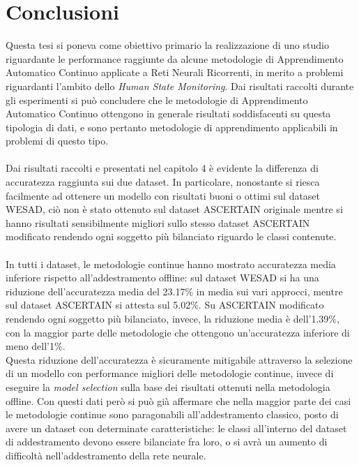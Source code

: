 \chapter{Conclusioni}
Questa tesi si poneva come obiettivo primario la realizzazione di uno studio riguardante le performance raggiunte da alcune metodologie di Apprendimento Automatico Continuo applicate a Reti Neurali Ricorrenti, in merito a problemi riguardanti l'ambito dello \textit{Human State Monitoring}. Dai risultati raccolti durante gli esperimenti si può concludere che le metodologie di Apprendimento Automatico Continuo ottengono in generale risultati soddisfacenti su questa tipologia di dati, e sono pertanto metodologie di apprendimento applicabili in problemi di questo tipo.\\\\
Dai risultati raccolti e presentati nel capitolo 4 è evidente la differenza di accuratezza raggiunta sui due dataset. In particolare, nonostante si riesca facilmente ad ottenere un modello con risultati buoni o ottimi sul dataset WESAD, ciò non è stato ottenuto sul dataset ASCERTAIN originale mentre si hanno risultati sensibilmente migliori sullo stesso dataset ASCERTAIN modificato rendendo ogni soggetto più bilanciato riguardo le classi contenute.\\\\
In tutti i dataset, le metodologie continue hanno mostrato accuratezza media inferiore rispetto all'addestramento offline: sul dataset WESAD si ha una riduzione dell'accuratezza media del 23.17\% in media sui vari approcci, mentre sul dataset ASCERTAIN si attesta sul 5.02\%. Su ASCERTAIN modificato rendendo ogni soggetto più bilanciato, invece, la riduzione media è dell'1.39\%, con la maggior parte delle metodologie che ottengono un'accuratezza inferiore di meno dell'1\%.\\
Questa riduzione dell'accuratezza è sicuramente mitigabile attraverso la selezione di un modello con performance migliori delle metodologie continue, invece di eseguire la \textit{model selection} sulla base dei risultati ottenuti nella metodologia offline. Con questi dati però si può già affermare che nella maggior parte dei casi le metodologie continue sono paragonabili all'addestramento classico, posto di avere un dataset con determinate caratteristiche: le classi all'interno del dataset di addestramento devono essere bilanciate fra loro, o si avrà un aumento di difficoltà nell'addestramento della rete neurale.\\\\
